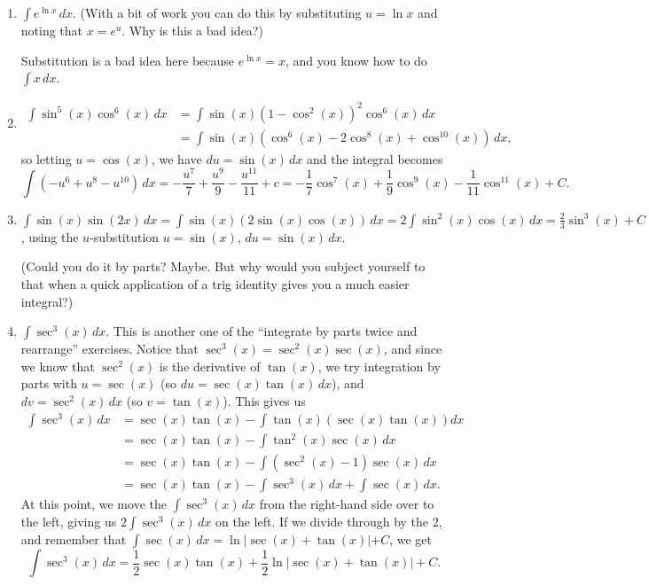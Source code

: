 \documentclass[12pt]{article}
\newcommand{\di}{\displaystyle}
\begin{document}
\begin{enumerate}
 \item $\di \int e^{\ln x}\,dx$. (With a bit of work you can do this by substituting $u=\ln x$ and noting that $x=e^u$. Why is this a bad idea?)

Substitution is a bad idea here because $e^{\ln x} = x$, and you know how to do $\int x\,dx$.
\pagebreak
 \item \begin{align*}
\int \sin^5(x)\cos^6(x)\,dx &= \int \sin(x)(1-\cos^2(x))^2\cos^6(x)\,dx\\& = \int \sin(x)(\cos^6(x)-2\cos^8(x)+\cos^{10}(x))\,dx, 
       \end{align*}
so letting $u=\cos(x)$, we have $du =\sin (x)\,dx$        and the integral becomes
\[
 \int(-u^6+u^8-u^{10})\,dx = -\frac{u^7}{7}+\frac{u^9}{9}-\frac{u^{11}}{11} +c = -\frac{1}{7}\cos^7(x)+\frac{1}{9}\cos^9(x)-\frac{1}{11}\cos^{11}(x)+C.
\]





 \item $\di \int \sin(x)\sin(2x)\,dx = \int \sin(x)(2\sin(x)\cos(x))\,dx = 2\int \sin^2(x)\cos(x)\,dx = \frac{2}{3}\sin^{3}(x)+C$, using the $u$-substitution $u=\sin(x)$, $du = \sin(x)\,dx$.
 
 (Could you do it by parts? Maybe. But why would you subject yourself to that when a quick application of a trig identity gives you a much easier integral?)

 \item $\di \int \sec^3(x)\,dx$. This is another one of the ``integrate by parts twice and rearrange'' exercises. Notice that $\sec^3(x) = \sec^2(x)\sec(x)$, and since we know that $\sec^2(x)$ is the derivative of $\tan(x)$, we try integration by parts with $u=\sec(x)$ (so $du = \sec(x)\tan(x)\,dx$), and $dv = \sec^2(x)\,dx$ (so $v=\tan(x)$). This gives us
\begin{align*}
\int \sec^3(x)\,dx &= \sec(x)\tan(x)-\int \tan(x)(\sec(x)\tan(x))dx\\
& = \sec(x)\tan(x) - \int \tan^2(x)\sec(x)\,dx\\
& = \sec(x)\tan(x) - \int (\sec^2(x)-1)\sec(x)\,dx\\
& = \sec(x)\tan(x) - \int \sec^3(x)\,dx + \int \sec(x)\,dx.
\end{align*}
At this point, we move the $\int \sec^3(x)\,dx$ from the right-hand side over to the left, giving us $2\int \sec^3(x)\,dx$ on the left. If we divide through by the 2, and remember that $\int \sec(x)\,dx = \ln\lvert \sec(x)+\tan(x)|+C$, we get
\[
\int \sec^3(x)\,dx = \frac{1}{2}\sec(x)\tan(x)+\frac{1}{2}\ln\lvert \sec(x)+\tan(x)\rvert +C.
\]


\end{enumerate}
\end{document}
